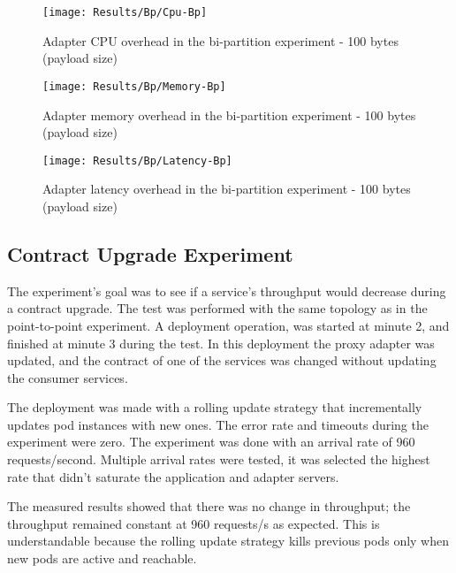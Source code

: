 \begin{figure}[htbp]
    \centering
    \centerline{\texttt{[image: Results/Bp/Cpu-Bp]}}
    \caption{Adapter CPU overhead in the bi-partition experiment - 100 bytes (payload size)}
    \label{fig:biPartCPU}
\end{figure}

\begin{figure}[htbp]
    \centering
    \centerline{\texttt{[image: Results/Bp/Memory-Bp]}}
    \caption{Adapter memory overhead in the bi-partition experiment - 100 bytes (payload size)}
    \label{fig:biPartMem}
\end{figure}

\begin{figure}[htbp]
    \centering
    \centerline{\texttt{[image: Results/Bp/Latency-Bp]}}
    \caption{Adapter latency overhead in the bi-partition experiment - 100 bytes (payload size)}
    \label{fig:biPartLatency}
\end{figure}

\newpage

\subsection{Contract Upgrade Experiment}

The experiment's goal was to see if a service's throughput would decrease during a contract upgrade.
The test was performed with the same topology as in the point-to-point experiment.
A deployment operation, was started at minute 2, and finished at minute 3 during the test.
In this deployment the proxy adapter was updated, and the contract of one of the services was changed without updating the consumer services.

The deployment was made with a rolling update strategy that incrementally updates pod instances with new ones.
The error rate and timeouts during the experiment were zero.
The experiment was done with an arrival rate of 960 requests/second.
Multiple arrival rates were tested, it was selected the highest rate that didn't saturate the application and adapter servers.

The measured results showed that there was no change in throughput; the throughput remained constant at 960 requests/s as expected.
This is understandable because the rolling update strategy kills previous pods only when new pods are active and reachable.
